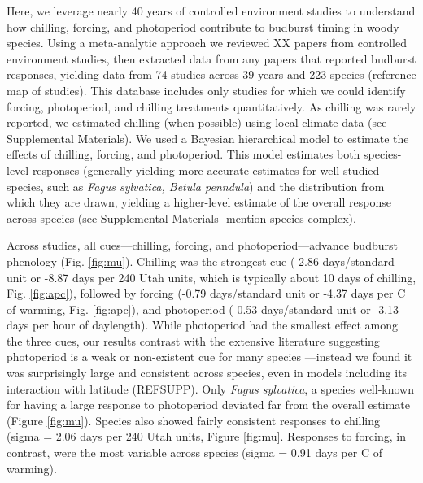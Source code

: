\documentclass{article}
\begin{document}
\par Here, we leverage nearly 40 years of controlled environment studies to understand how chilling, forcing, and photoperiod contribute to budburst timing in woody species. Using a meta-analytic approach we reviewed XX papers from controlled environment studies, then extracted data from any papers that reported budburst responses, yielding data from 74 studies across 39 years and 223 species (reference map of studies).  This database includes only studies for which we could identify forcing, photoperiod, and chilling treatments quantitatively. As chilling was rarely reported, we estimated chilling (when possible) using local climate data (see Supplemental Materials). We used a Bayesian hierarchical model to estimate the effects of chilling, forcing, and photoperiod. This model estimates both species-level responses (generally yielding more accurate estimates for well-studied species, such as \emph{Fagus sylvatica, Betula penndula}) and the distribution from which they are drawn, yielding a higher-level estimate of the overall response across species (see Supplemental Materials- mention species complex).\\ %


\par Across studies, all cues---chilling, forcing, and photoperiod---advance budburst phenology (Fig. \ref {fig:mu}). Chilling was the strongest cue (-2.86 days/standard unit or -8.87 days per 240 Utah units, which is typically about 10 days of chilling, Fig. \ref {fig:apc}), followed by forcing (-0.79 days/standard unit or -4.37 days per \degree C of warming, Fig. \ref {fig:apc}), and photoperiod (-0.53 days/standard unit or -3.13 days per hour of daylength). While photoperiod had the smallest effect among the three cues, our results contrast with the extensive literature suggesting photoperiod is a weak or non-existent cue for many species \citep{zohner2016,koerner2010a}---instead we found it was surprisingly large and consistent across species, even in models including its interaction with latitude (REFSUPP). Only \emph{Fagus sylvatica}, a species well-known for having a large response to photoperiod deviated far from the overall estimate (Figure \ref {fig:mu}). Species also showed fairly consistent responses to chilling (sigma = 2.06 days per 240 Utah units, Figure \ref {fig:mu}.
Responses to forcing, in contrast, were the most variable across species (sigma = 0.91 days per \degree C of warming).
\end{document}
